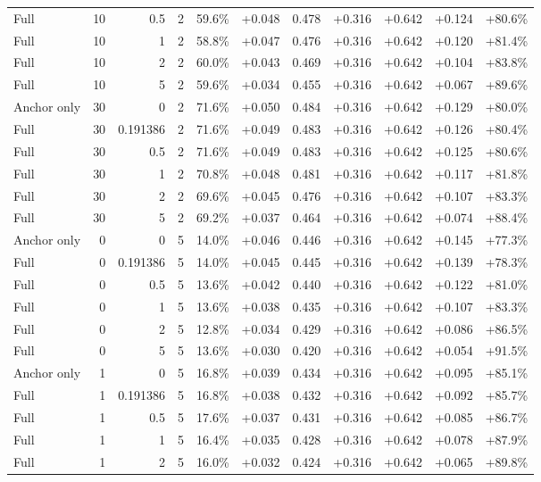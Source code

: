 \begin{table}[htbp]
\begin{tabular}{lrrrccccccc}
Full & 10 & 0.5 & 2 & 59.6\% & +0.048 & 0.478 & +0.316 & +0.642 & +0.124 & +80.6\% \\
Full & 10 & 1 & 2 & 58.8\% & +0.047 & 0.476 & +0.316 & +0.642 & +0.120 & +81.4\% \\
Full & 10 & 2 & 2 & 60.0\% & +0.043 & 0.469 & +0.316 & +0.642 & +0.104 & +83.8\% \\
Full & 10 & 5 & 2 & 59.6\% & +0.034 & 0.455 & +0.316 & +0.642 & +0.067 & +89.6\% \\
Anchor only & 30 & 0 & 2 & 71.6\% & +0.050 & 0.484 & +0.316 & +0.642 & +0.129 & +80.0\% \\
Full & 30 & 0.191386 & 2 & 71.6\% & +0.049 & 0.483 & +0.316 & +0.642 & +0.126 & +80.4\% \\
Full & 30 & 0.5 & 2 & 71.6\% & +0.049 & 0.483 & +0.316 & +0.642 & +0.125 & +80.6\% \\
Full & 30 & 1 & 2 & 70.8\% & +0.048 & 0.481 & +0.316 & +0.642 & +0.117 & +81.8\% \\
Full & 30 & 2 & 2 & 69.6\% & +0.045 & 0.476 & +0.316 & +0.642 & +0.107 & +83.3\% \\
Full & 30 & 5 & 2 & 69.2\% & +0.037 & 0.464 & +0.316 & +0.642 & +0.074 & +88.4\% \\
Anchor only & 0 & 0 & 5 & 14.0\% & +0.046 & 0.446 & +0.316 & +0.642 & +0.145 & +77.3\% \\
Full & 0 & 0.191386 & 5 & 14.0\% & +0.045 & 0.445 & +0.316 & +0.642 & +0.139 & +78.3\% \\
Full & 0 & 0.5 & 5 & 13.6\% & +0.042 & 0.440 & +0.316 & +0.642 & +0.122 & +81.0\% \\
Full & 0 & 1 & 5 & 13.6\% & +0.038 & 0.435 & +0.316 & +0.642 & +0.107 & +83.3\% \\
Full & 0 & 2 & 5 & 12.8\% & +0.034 & 0.429 & +0.316 & +0.642 & +0.086 & +86.5\% \\
Full & 0 & 5 & 5 & 13.6\% & +0.030 & 0.420 & +0.316 & +0.642 & +0.054 & +91.5\% \\
Anchor only & 1 & 0 & 5 & 16.8\% & +0.039 & 0.434 & +0.316 & +0.642 & +0.095 & +85.1\% \\
Full & 1 & 0.191386 & 5 & 16.8\% & +0.038 & 0.432 & +0.316 & +0.642 & +0.092 & +85.7\% \\
Full & 1 & 0.5 & 5 & 17.6\% & +0.037 & 0.431 & +0.316 & +0.642 & +0.085 & +86.7\% \\
Full & 1 & 1 & 5 & 16.4\% & +0.035 & 0.428 & +0.316 & +0.642 & +0.078 & +87.9\% \\
Full & 1 & 2 & 5 & 16.0\% & +0.032 & 0.424 & +0.316 & +0.642 & +0.065 & +89.8\% \\

\end{tabular}
\end{table}
